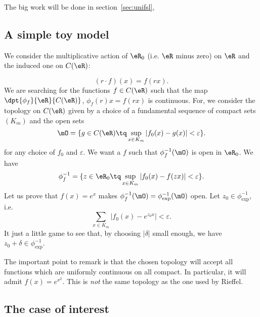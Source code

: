 The big work will be done in section~\ref{sec:unifsl},

\subsection{A simple toy model}

We consider the multiplicative action of $\eR_0$ (i.e. $\eR$ minus zero) on $\eR$ and the induced one on $C(\eR)$:

\begin{equation}
	(r\cdot f)(x)=f(rx).
\end{equation}
We are searching for the functions $f\in C(\eR)$ such that the map $\dpt{\phi_f}{\eR}{C(\eR)}$, $\phi_f(r)x=f(rx)$ is continuous. For, we consider the topology on $C(\eR)$ given by a choice of a fundamental sequence of compact sets $(K_m)$ and the open sets
\[
	\mO=\{ g\in C(\eR)\tq \sup_{x\in K_m}| f_0(x)-g(x) |<\varepsilon \}.
\]
for any choice of $f_0$ and $\varepsilon$. We want a $f$ such that $\phi_f^{-1}(\mO)$ is open in $\eR_0$. We have
\begin{equation}
	\phi^{-1}_f=\{ z\in\eR_0\tq \sup_{x\in K_m}| f_0(x)-f(zx) |<\varepsilon \}.
\end{equation}
Let us prove that $f(x)=e^x$ makes $\phi_f^{-1}(\mO)=\phi_{\exp}^{-1}(\mO)$ open. Let $z_0\in \phi^{-1}_{\exp}$, i.e.
\[
	\sum_{x\in K_m}| f_0(x)-e^{z_0x} |<\varepsilon.
\]
It just a little game to see that, by choosing $| \delta |$ small enough, we have $z_0+\delta\in\phi_{\exp}^{-1}$.

The important point to remark is that the chosen topology will accept all functions which are uniformly continuous on all compact. In particular, it will admit $f(x)=e^{x^2}$. This is \emph{not} the same topology as the one used by Rieffel.

\subsection{The case of interest}

